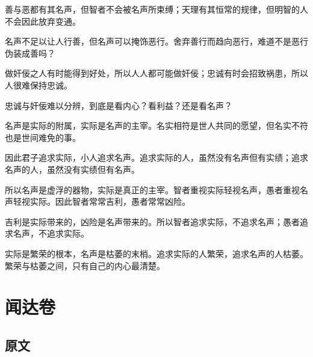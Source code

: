 \documentclass[12pt,UTF8]{ctexbook}
\begin{document}
善与恶都有其名声，但智者不会被名声所束缚；天理有其恒常的规律，但明智的人不会因此放弃变通。

名声不足以让人行善，但名声可以掩饰恶行。舍弃善行而趋向恶行，难道不是恶行伪装成善吗？

做奸佞之人有时能得到好处，所以人人都可能做奸佞；忠诚有时会招致祸患，所以人很难保持忠诚。

忠诚与奸佞难以分辨，到底是看内心？看利益？还是看名声？

名声是实际的附属，实际是名声的主宰。名实相符是世人共同的愿望，但名实不符也是世间难免的事。

因此君子追求实际，小人追求名声。追求实际的人，虽然没有名声但有实绩；追求名声的人，虽然没有实绩但有名声。

所以名声是虚浮的器物，实际是真正的主宰。智者重视实际轻视名声，愚者重视名声轻视实际。因此智者常常吉利，愚者常常凶险。

吉利是实际带来的，凶险是名声带来的。所以智者追求实际，不追求名声；愚者追求名声，不追求实际。

实际是繁荣的根本，名声是枯萎的末梢。追求实际的人繁荣，追求名声的人枯萎。繁荣与枯萎之间，只有自己的内心最清楚。

\part{闻达卷}

\chapter{原文}
\end{document}

